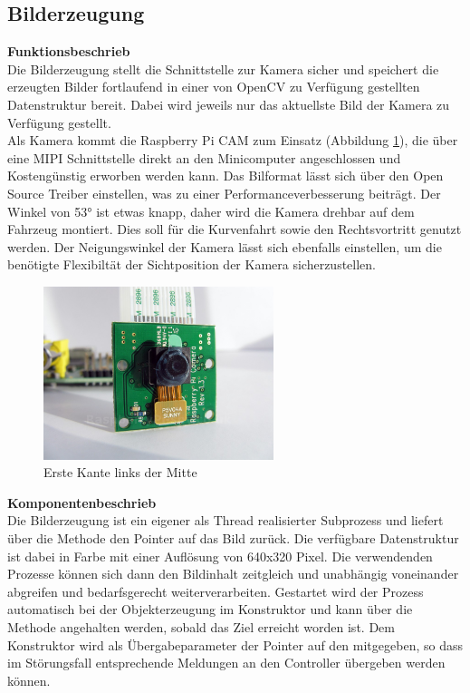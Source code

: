 \subsection{Bilderzeugung}
\textbf{Funktionsbeschrieb}\\[0.2cm]
Die Bilderzeugung stellt die Schnittstelle zur Kamera sicher und speichert die erzeugten Bilder fortlaufend in einer von OpenCV zu Verfügung gestellten Datenstruktur bereit. Dabei wird jeweils nur das aktuellste Bild der Kamera zu Verfügung gestellt.\\
Als Kamera kommt die Raspberry Pi CAM zum Einsatz (Abbildung \ref{fig:camera}), die über eine MIPI Schnittstelle direkt an den Minicomputer angeschlossen und Kostengünstig erworben werden kann. Das Bilformat lässt sich über den Open Source Treiber einstellen, was zu einer Performanceverbesserung beiträgt. Der Winkel von 53° ist etwas knapp, daher wird die Kamera drehbar auf dem Fahrzeug montiert. Dies soll für die Kurvenfahrt sowie den Rechtsvortritt genutzt werden. Der Neigungswinkel der Kamera lässt sich ebenfalls einstellen, um die benötigte Flexibiltät der Sichtposition der Kamera sicherzustellen.
\begin{figure}[H]
\centering
\includegraphics[width=0.6\textwidth]{03_Loesungskonzept/pictures/raspberry-pi-camera-module.jpg}
\caption{Erste Kante links der Mitte}
\label{fig:camera}
\end{figure}
\textbf{Komponentenbeschrieb}\\[0.2cm]
Die Bilderzeugung ist ein eigener als Thread realisierter Subprozess und liefert über die Methode  den Pointer auf das Bild zurück. Die verfügbare Datenstruktur ist dabei  in Farbe mit einer Auflösung von 640x320 Pixel. Die verwendenden Prozesse können sich dann den Bildinhalt zeitgleich und unabhängig voneinander abgreifen und bedarfsgerecht weiterverarbeiten. Gestartet wird der Prozess automatisch bei der Objekterzeugung im Konstruktor und kann über die Methode  angehalten werden, sobald das Ziel erreicht worden ist. Dem Konstruktor wird als Übergabeparameter der Pointer auf den  mitgegeben, so dass im Störungsfall entsprechende Meldungen an den Controller übergeben werden können.\\[0.2cm]
